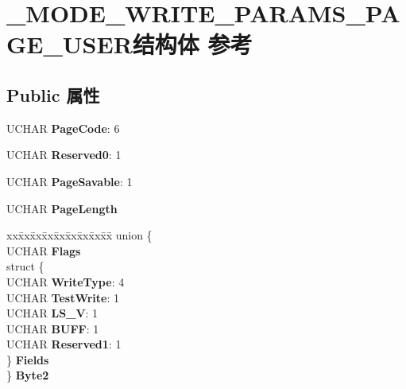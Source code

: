 \hypertarget{struct___m_o_d_e___w_r_i_t_e___p_a_r_a_m_s___p_a_g_e___u_s_e_r}{}\section{\+\_\+\+M\+O\+D\+E\+\_\+\+W\+R\+I\+T\+E\+\_\+\+P\+A\+R\+A\+M\+S\+\_\+\+P\+A\+G\+E\+\_\+\+U\+S\+E\+R结构体 参考}
\label{struct___m_o_d_e___w_r_i_t_e___p_a_r_a_m_s___p_a_g_e___u_s_e_r}
\subsection*{Public 属性}
\begin{DoxyCompactItemize}
\item 
\mbox{\label{struct___m_o_d_e___w_r_i_t_e___p_a_r_a_m_s___p_a_g_e___u_s_e_r_a853286dd93dce5d0595b43b99b88d5fc}} 
U\+C\+H\+AR {\bfseries Page\+Code}\+: 6
\item 
\mbox{\label{struct___m_o_d_e___w_r_i_t_e___p_a_r_a_m_s___p_a_g_e___u_s_e_r_aa503c9e1bef3cecb806a25dcefcbda4f}} 
U\+C\+H\+AR {\bfseries Reserved0}\+: 1
\item 
\mbox{\label{struct___m_o_d_e___w_r_i_t_e___p_a_r_a_m_s___p_a_g_e___u_s_e_r_a16777291f8c401afdb47c83ee692e7aa}} 
U\+C\+H\+AR {\bfseries Page\+Savable}\+: 1
\item 
\mbox{\label{struct___m_o_d_e___w_r_i_t_e___p_a_r_a_m_s___p_a_g_e___u_s_e_r_aa695069756031f8f5ae85946d2ca4897}} 
U\+C\+H\+AR {\bfseries Page\+Length}
\item 
\mbox{\label{struct___m_o_d_e___w_r_i_t_e___p_a_r_a_m_s___p_a_g_e___u_s_e_r_a8edaa071de53520eaa416bc215370b2a}} 
\begin{tabbing}
xx\=xx\=xx\=xx\=xx\=xx\=xx\=xx\=xx\=\kill
union \{\\
\>UCHAR {\bfseries Flags}\\
\>struct \{\\
\>\>UCHAR {\bfseries WriteType}: 4\\
\>\>UCHAR {\bfseries TestWrite}: 1\\
\>\>UCHAR {\bfseries LS\_V}: 1\\
\>\>UCHAR {\bfseries BUFF}: 1\\
\>\>UCHAR {\bfseries Reserved1}: 1\\
\>\} {\bfseries Fields}\\
\} {\bfseries Byte2}\\


\end{tabbing}
\end{DoxyCompactItemize}
